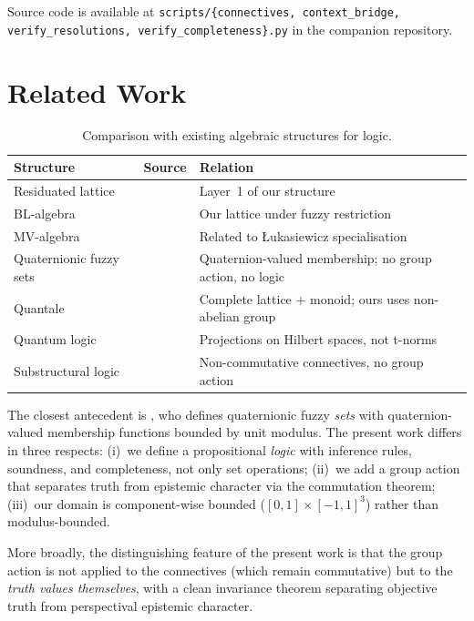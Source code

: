 \documentclass[11pt,a4paper]{article}
\begin{document}
Source code is available at
\texttt{scripts/\{connectives, context\_bridge, verify\_resolutions,
verify\_completeness\}.py} in the companion repository.

\section{Related Work}
\label{sec:related}

\begin{table}[H]
\centering
\caption{Comparison with existing algebraic structures for logic.}
\label{tab:related}
\begin{tabularx}{\textwidth}{@{}lp{3.5cm}Y@{}}
\toprule
\textbf{Structure} & \textbf{Source} & \textbf{Relation} \\
\midrule
Residuated lattice & \citet{galatos2007} & Layer~1 of our structure \\
BL-algebra & \citet{hajek1998} & Our lattice under fuzzy restriction \\
MV-algebra & \citet{cignoli2000} & Related to {\L}ukasiewicz specialisation \\
Quaternionic fuzzy sets & \citet{dai2023} & Quaternion-valued membership; no group action, no logic \\
Quantale & \citet{mulvey1986} & Complete lattice + monoid; ours uses non-abelian group \\
Quantum logic & \citet{birkhoff1936} & Projections on Hilbert spaces, not t-norms \\
Substructural logic & \citet{restall2000} & Non-commutative connectives, no group action \\
\bottomrule
\end{tabularx}
\end{table}

The closest antecedent is \citet{dai2023}, who defines
quaternionic fuzzy \emph{sets} with quaternion-valued membership
functions bounded by unit modulus. The present work differs in
three respects: (i)~we define a propositional \emph{logic} with
inference rules, soundness, and completeness, not only set
operations; (ii)~we add a group action that separates truth from
epistemic character via the commutation theorem; (iii)~our domain
is component-wise bounded ($[0,1]\times[-1,1]^3$) rather than
modulus-bounded.

More broadly, the distinguishing feature of the present work is
that the group action is not applied to the connectives (which
remain commutative) but to the \emph{truth values themselves},
with a clean invariance theorem separating objective truth from
perspectival epistemic character.
\end{document}
